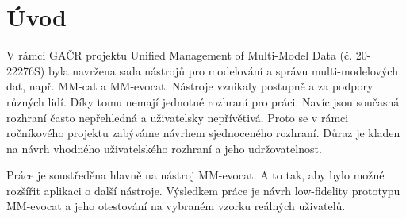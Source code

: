 \chapter*{Úvod}

V rámci GAČR projektu Unified Management of Multi-Model Data (č. 20-22276S) 
byla navržena sada nástrojů pro modelování a správu multi-modelových dat, 
např. MM-cat a MM-evocat. Nástroje vznikaly postupně a za podpory různých 
lidí. Díky tomu nemají jednotné rozhraní pro práci. Navíc jsou současná 
rozhraní často nepřehledná a uživatelsky nepřívětivá. Proto se v rámci 
ročníkového projektu zabýváme návrhem sjednoceného rozhraní. Důraz je 
kladen na návrh vhodného uživatelského rozhraní a jeho udržovatelnost.

Práce je soustředěna hlavně na nástroj MM-evocat. A to tak, aby bylo možné rozšířit aplikaci o další nástroje. Výsledkem práce je návrh low-fidelity prototypu MM-evocat a jeho otestování na vybraném vzorku reálných uživatelů.

